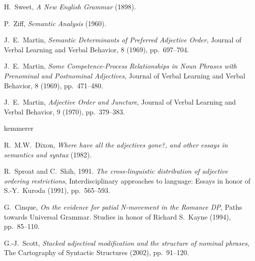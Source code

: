 \documentclass[12pt]{article}
\begin{document}
\begin{thebibliography}{10}
	
	H.~Sweet, {\em A New English Grammar} (1898).
	
	P.~Ziff, {\em Semantic Analysis} (1960).
	
	J.~E.~Martin, {\em Semantic Determinants of Preferred Adjective Order}, Journal of Verbal Learning and Verbal Behavior, 8 (1969), pp.~697--704. 
	
	J.~E.~Martin, {\em Some Competence-Process Relationships in Noun Phrases with Prenominal and Postnominal Adjectives}, Journal of Verbal Learning and Verbal Behavior, 8 (1969), pp.~471--480. 
	
	J.~E.~Martin, {\em Adjective Order and Juncture}, Journal of Verbal Learning and Verbal Behavior, 9 (1970), pp.~379--383. 

	kemmerer
	
	R.~M.W.~Dixon, {\em Where have all the adjectives gone?, and other essays in semantics and syntax} (1982).

	R.~Sproat and C.~Shih, 1991. {\em The cross-linguistic distribution of adjective ordering restrictions}, Interdisciplinary approaches to language: Essays in honor of S.-Y.~Kuroda (1991), pp.~565--593.
	
	G.~Cinque, {\em On the evidence for patial N-movement in the Romance DP}, Paths towards Universal Grammar. Studies in honor of Richard S.~Kayne (1994), pp.~85--110.
	
	G.-J.~Scott, {\em Stacked adjectival modification and the structure of nominal phrases}, The Cartography of Syntactic Structures (2002), pp.~91--120.
\end{thebibliography}


%
%
\end{document}
